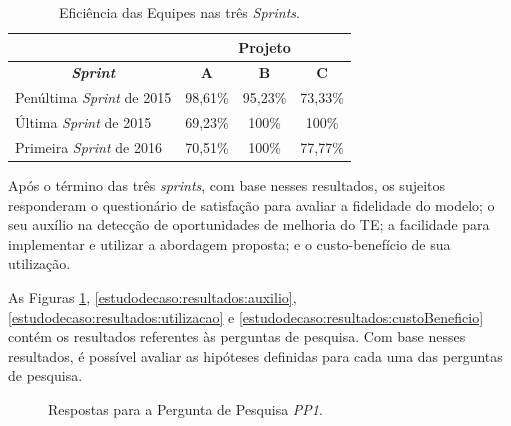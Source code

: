 \begin{table}[ht!]
\centering
\caption{Eficiência das Equipes nas três \textit{Sprints}.}
\label{estudodecaso:resultados:eficiencias}
\begin{tabular}{|l|c|c|c|}
\hline
\multicolumn{1}{|c|}{}                         & \multicolumn{3}{c|}{\textbf{Projeto}} \\ \hline
\multicolumn{1}{|c|}{\textbf{\textit{Sprint}}} & \textbf{A}  & \textbf{B} & \textbf{C} \\ \hline
Penúltima \textit{Sprint} de 2015              & 98,61\%     & 95,23\%    & 73,33\%    \\ \hline
Última \textit{Sprint} de 2015                 & 69,23\%     & 100\%      & 100\%      \\ \hline
Primeira \textit{Sprint} de 2016               & 70,51\%     & 100\%      & 77,77\%    \\ \hline
\end{tabular}
\end{table}

Após o término das três \textit{sprints}, com base nesses resultados, os sujeitos responderam o questionário de satisfação para avaliar a fidelidade do modelo; o seu auxílio na detecção de oportunidades de melhoria do TE; a facilidade para implementar e utilizar a abordagem proposta; e o custo-benefício de sua utilização.

As Figuras \ref{estudodecaso:resultados:fidelidade}, \ref{estudodecaso:resultados:auxilio}, \ref{estudodecaso:resultados:utilizacao} e \ref{estudodecaso:resultados:custoBeneficio} contém os resultados referentes às perguntas de pesquisa. Com base nesses resultados, é possível avaliar as hipóteses definidas para cada uma das perguntas de pesquisa.

\begin{figure}[H]
\begin{center}
	\end{center}
	\caption{Respostas para a Pergunta de Pesquisa \textit{PP1}.}
	\label{estudodecaso:resultados:fidelidade}
\end{figure}

